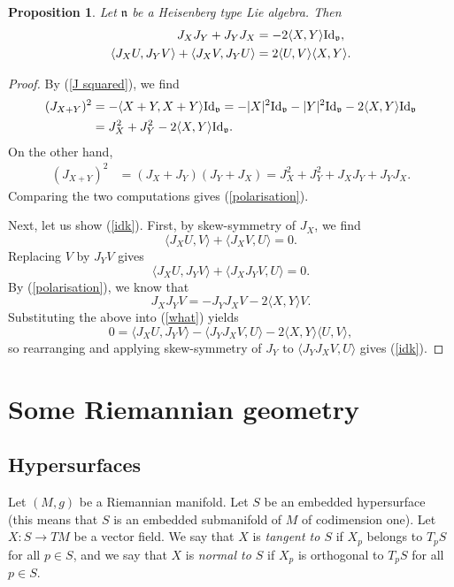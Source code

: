 \documentclass{amsart}
\newcommand{\id}{\text{\normalfont Id}}
\renewcommand{\v}{\mathfrak v}
\newcommand{\n}{\mathfrak n}
\theoremstyle{plain}
\newtheorem{proposition}[theorem]{Proposition}
\theoremstyle{definition}
\theoremstyle{remark}
\begin{document}
	\begin{proposition}
		\label{J equation}
		Let $\n$ be a Heisenberg type Lie algebra. Then 
		\begin{align}
			J_X J_Y + J_Y J_X &= - 2 \langle X,Y \rangle \id_\v, \label{polarisation} \\
			\langle J_X U , J_Y V \rangle + \langle J_X V, J_Y U \rangle &= 2 \langle U,V \rangle \langle X,Y \rangle. \label{idk}
		\end{align}
	\end{proposition}
	\begin{proof}
		By (\ref{J squared}), we find 
		\begin{align*}
			(J_{X+Y})^2 &= - \langle X+Y, X+Y \rangle \id_\v = -|X|^2 \id_\v - |Y|^2\id_\v - 2 \langle X,Y \rangle \id_\v \\
			&= J_X^2 +J_Y^2 - 2 \langle X,Y \rangle \id_\v.
		\end{align*}
		On the other hand, 
		\begin{align*}
			(J_{X+Y})^2 &= (J_X + J_Y)(J_Y + J_X) = J_X^2 + J_Y^2 + J_X J_Y + J_Y J_X.
		\end{align*}
		Comparing the two computations gives (\ref{polarisation}).
		
		Next, let us show (\ref{idk}). First, by skew-symmetry of $J_X$, we find 
		$$\langle J_X U,V \rangle + \langle J_X V, U \rangle = 0.$$
		Replacing $V$ by $J_Y V$ gives 
		\begin{equation}
			\langle J_X U , J_Y V \rangle + \langle J_X J_Y V, U \rangle = 0. \label{what}
		\end{equation}
		By (\ref{polarisation}), we know that 
		$$J_X J_Y V = - J_Y J_X V - 2 \langle X,Y \rangle V.$$
		Substituting the above into (\ref{what}) yields
		$$0 = \langle J_X U, J_Y V \rangle - \langle J_Y J_X V,U \rangle - 2\langle X,Y \rangle \langle U,V \rangle,$$
		so rearranging and applying skew-symmetry of $J_Y$ to $\langle J_Y J_X V,U \rangle$ gives (\ref{idk}).
	\end{proof}

	\section{Some Riemannian geometry}
	\subsection{Hypersurfaces}
	Let $(M,g)$ be a Riemannian manifold. Let $S$ be an embedded hypersurface (this means that $S$ is an embedded submanifold of $M$ of codimension one). Let $X:S \rightarrow TM$ be a vector field. We say that $X$ is \emph{tangent to $S$} if $X_p$ belongs to $T_p S$ for all $p \in S$, and we say that $X$ is \emph{normal to $S$} if $X_p$ is orthogonal to $T_p S$ for all $p \in S$.
	
\end{document}
